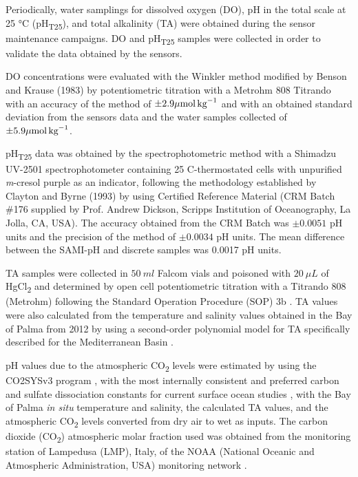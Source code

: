 Periodically, water samplings for dissolved oxygen (DO), pH in the total scale
at 25 °C (pH\textsubscript{T25}), and total alkalinity (TA) were obtained
during the sensor maintenance campaigns. DO and pH\textsubscript{T25} samples
were collected in order to validate the data obtained by the sensors.

DO concentrations were evaluated with the Winkler method modified by Benson
and Krause (1983) \cite{Benson_Krause_1984} by potentiometric titration with a
Metrohm 808 Titrando with an accuracy of the method of $\pm 2.9
        {\mu\textrm{mol\,kg}^{-1}}$ and with an obtained standard deviation
from the sensors data and the water samples collected of $\pm 5.9
        {\mu\textrm{mol\,kg}^{-1}}$.

pH\textsubscript{T25} data was obtained by the spectrophotometric method
with a Shimadzu UV-2501 spectrophotometer containing 25 \textdegree
C-thermostated cells with unpurified \emph{m}-cresol purple as an indicator,
following the methodology established by Clayton and Byrne (1993)
\cite{Clayton_Byrne_1993} by using Certified Reference	Material (CRM Batch
\#176 supplied by Prof. Andrew Dickson, Scripps  Institution  of  Oceanography,
La  Jolla,  CA,  USA). The accuracy obtained from the CRM Batch was $\pm0.0051$
pH units and the precision of the method  of $\pm0.0034$ pH units. The mean
difference between the SAMI-pH and discrete samples was 0.0017 pH units.

TA samples were collected in $\SI{50}{ml}$ Falcom vials and poisoned with
$\SI{20}{\mu L}$ of HgCl\textsubscript{2} and determined by open cell
potentiometric titration with a Titrando 808 (Metrohm) following the Standard
Operation Procedure (SOP) 3b \cite{Dickson2007}.
TA values were also calculated from the temperature and salinity values
obtained in the Bay of Palma from 2012 by using a second-order polynomial model
for TA specifically described for the Mediterranean Basin \cite{Gemayel2015}.

pH values due to the atmospheric CO\textsubscript{2} levels were estimated
by using the CO2SYSv3 program \cite{Sharp2020}, with the most internally
consistent and preferred carbon \cite{mehrbach1973,dickson1987} and sulfate
dissociation constants \cite{dickson1990} for current surface ocean
studies \cite{woosley2021}, with the Bay of Palma \emph{in situ} temperature
and salinity, the calculated TA values, and the atmospheric CO\textsubscript{2}
levels converted from dry air to wet \cite{weiss1980nitrous} as inputs. The
carbon dioxide (CO\textsubscript{2}) atmospheric molar fraction used was
obtained from the monitoring station of Lampedusa (LMP), Italy, of the NOAA
(National Oceanic and Atmospheric Administration, USA) monitoring network
\cite{Duglokencky2021}.

